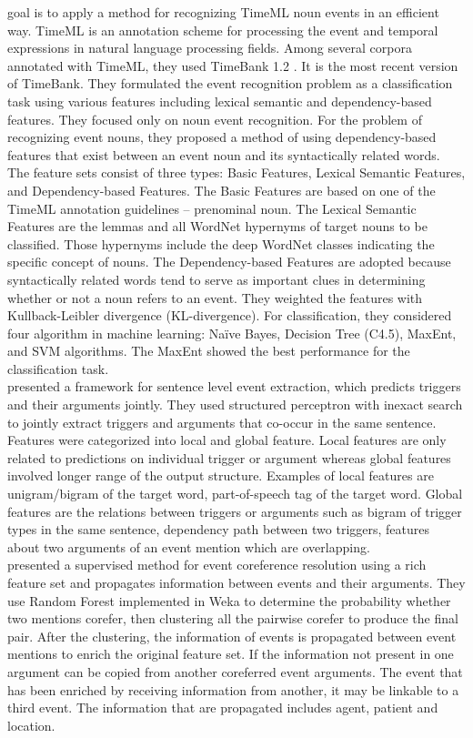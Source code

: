 \indent \cite{jeong2012using} goal is to apply a method for recognizing TimeML noun events in an efficient way. TimeML \cite{pustejovsky2005specification} is an annotation scheme for processing the event and temporal expressions in natural language processing fields. Among several corpora annotated with TimeML, they used TimeBank 1.2 \cite{pustejovsky2006timebank}. It is the most recent version of TimeBank. They formulated the event recognition problem as a classification task using various features including lexical semantic and dependency-based features. They focused only on noun event recognition. For the problem of recognizing event nouns, they proposed a method of using dependency-based features that exist between an event noun and its syntactically related words. The feature sets consist of three types: Basic Features, Lexical Semantic Features, and Dependency-based Features. The Basic Features are based on one of the TimeML annotation guidelines – prenominal noun. The Lexical Semantic Features are the lemmas and all WordNet hypernyms of target nouns to be classified. Those hypernyms include the deep WordNet classes indicating the specific concept of nouns. The Dependency-based Features are adopted because syntactically related words tend to serve as important clues in determining whether or not a noun refers to an event. They weighted the features with Kullback-Leibler divergence (KL-divergence). For classification, they considered four algorithm in machine learning: Naïve Bayes, Decision Tree (C4.5), MaxEnt, and SVM algorithms. The MaxEnt showed the best performance for the classification task.\\
\indent \cite{li2013joint} presented a framework for sentence level event extraction, which predicts triggers and their arguments jointly. They used structured perceptron with inexact search to jointly extract triggers and arguments that co-occur in the same sentence. Features were categorized into local and global feature. Local features are only related to predictions on individual trigger or argument whereas global features involved longer range of the output structure. Examples of local features are unigram/bigram of the target word, part-of-speech tag of the target word. Global features are the relations between triggers or arguments such as bigram of trigger types in the same sentence, dependency path between two triggers, features about two arguments of an event mention which are overlapping.\\
\indent \cite{liu2014supervised} presented a supervised method for event coreference resolution using a rich feature set and propagates information between events and their arguments. They use Random Forest implemented in Weka to determine the probability whether two mentions corefer, then clustering all the pairwise corefer to produce the final pair. After the clustering, the information of events is propagated between event mentions to enrich the original feature set. If the information not present in one argument can be copied from another coreferred event arguments. The event that has been enriched by receiving information from another, it may be linkable to a third event. The information that are propagated includes agent, patient and location. \\
